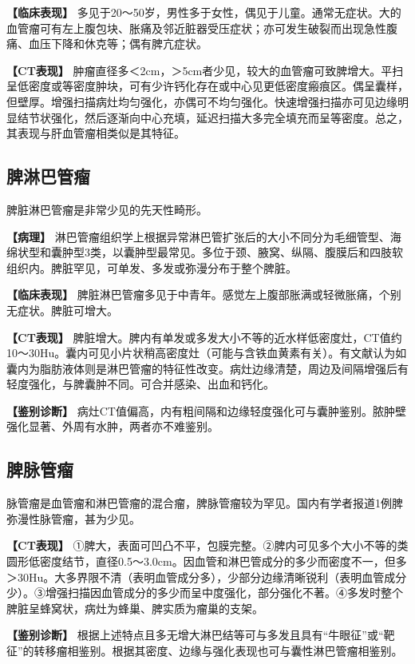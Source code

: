 \textbf{【临床表现】}
多见于20～50岁，男性多于女性，偶见于儿童。通常无症状。大的血管瘤可有左上腹包块、胀痛及邻近脏器受压症状；亦可发生破裂而出现急性腹痛、血压下降和休克等；偶有脾亢症状。

\textbf{【CT表现】}
肿瘤直径多＜2cm，＞5cm者少见，较大的血管瘤可致脾增大。平扫呈低密度或等密度肿块，可有少许钙化存在或中心见更低密度瘢痕区。偶呈囊样，但壁厚。增强扫描病灶均匀强化，亦偶可不均匀强化。快速增强扫描亦可见边缘明显结节状强化，然后逐渐向中心充填，延迟扫描大多完全填充而呈等密度。总之，其表现与肝血管瘤相类似是其特征。

\subsection{脾淋巴管瘤}

脾脏淋巴管瘤是非常少见的先天性畸形。

\textbf{【病理】}
淋巴管瘤组织学上根据异常淋巴管扩张后的大小不同分为毛细管型、海绵状型和囊肿型3类，以囊肿型最常见。多位于颈、腋窝、纵隔、腹膜后和四肢软组织内。脾脏罕见，可单发、多发或弥漫分布于整个脾脏。

\textbf{【临床表现】}
脾脏淋巴管瘤多见于中青年。感觉左上腹部胀满或轻微胀痛，个别无症状。脾脏可增大。

\textbf{【CT表现】}
脾脏增大。脾内有单发或多发大小不等的近水样低密度灶，CT值约10～30Hu。囊内可见小片状稍高密度灶（可能与含铁血黄素有关）。有文献认为如囊内为脂肪液体则是淋巴管瘤的特征性改变。病灶边缘清楚，周边及间隔增强后有轻度强化，与脾囊肿不同。可合并感染、出血和钙化。

\textbf{【鉴别诊断】}
病灶CT值偏高，内有粗间隔和边缘轻度强化可与囊肿鉴别。脓肿壁强化显著、外周有水肿，两者亦不难鉴别。

\subsection{脾脉管瘤}

脉管瘤是血管瘤和淋巴管瘤的混合瘤，脾脉管瘤较为罕见。国内有学者报道1例脾弥漫性脉管瘤，甚为少见。

\textbf{【CT表现】}
①脾大，表面可凹凸不平，包膜完整。②脾内可见多个大小不等的类圆形低密度结节，直径0.5～3.0cm。因血管和淋巴管成分的多少而密度不一，但多＞30Hu。大多界限不清（表明血管成分多），少部分边缘清晰锐利（表明血管成分少）。③增强扫描因血管成分的多少而呈中度强化，部分强化不著。④多发时整个脾脏呈蜂窝状，病灶为蜂巢、脾实质为瘤巢的支架。

\textbf{【鉴别诊断】}
根据上述特点且多无增大淋巴结等可与多发且具有“牛眼征”或“靶征”的转移瘤相鉴别。根据其密度、边缘与强化表现也可与囊性淋巴管瘤相鉴别。

